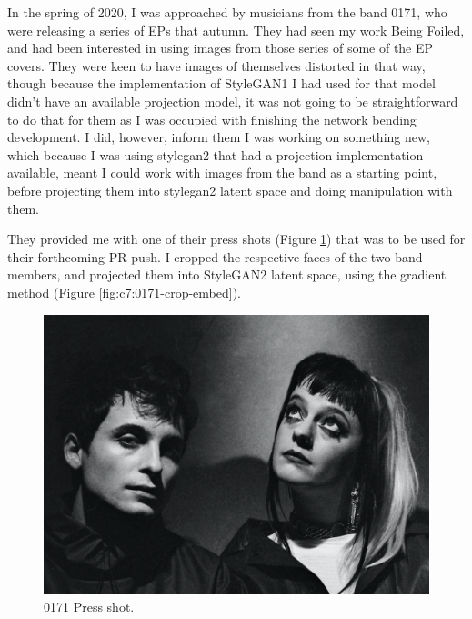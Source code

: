 In the spring of 2020, I was approached by musicians from the band 0171, who were releasing a series of EPs that autumn. 
They had seen my work Being Foiled, and had been interested in using images from those series of some of the EP covers. 
They were keen to have images of themselves distorted in that way, though because the implementation of StyleGAN1 I had used for that model didn’t have an available projection model, it was not going to be straightforward to do that for them as I was occupied with finishing the network bending development. 
I did, however, inform them I was working on something new, which because I was using stylegan2 that had a projection implementation available, meant I could work with images from the band as a starting point, before projecting them into stylegan2 latent space and doing manipulation with them. 

They provided me with one of their press shots (Figure \ref{fig:c7:0171-press-shot})  that was to be used for their forthcoming PR-push. 
I cropped the respective faces of the two band members, and projected them into StyleGAN2 latent space, using the gradient method \citep{abdal2019image2stylegan} (Figure \ref{fig:c7:0171-crop-embed}).

\begin{figure}[!htb]
    \centering
    \captionsetup{justification=centering}
    \includegraphics[width=1\textwidth]{figures/c7_impact/0171/press/0171-press-shot.png}
    \caption{0171 Press shot.}
    \label{fig:c7:0171-press-shot}
\end{figure}



